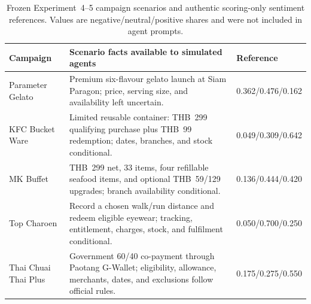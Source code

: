 \documentclass[conference]{IEEEtran}
\begin{document}
\begin{table}[t]
\caption{Frozen Experiment~4--5 campaign scenarios and authentic scoring-only
sentiment references. Values are negative/neutral/positive shares and were not
included in agent prompts.}
\label{tab:campaign-packets}
\centering
\scriptsize
\begin{tabular}{@{}p{}p{}p{}@{}}
\toprule
Campaign & Scenario facts available to simulated agents & Reference \\
\midrule
Parameter Gelato & Premium six-flavour gelato launch at Siam Paragon; price,
serving size, and availability left uncertain. & 0.362/0.476/0.162 \\
KFC Bucket Ware & Limited reusable container: THB~299 qualifying purchase plus
THB~99 redemption; dates, branches, and stock conditional. & 0.049/0.309/0.642 \\
MK Buffet & THB~299 net, 33 items, four refillable seafood items, and optional
THB~59/129 upgrades; branch availability conditional. & 0.136/0.444/0.420 \\
Top Charoen & Record a chosen walk/run distance and redeem eligible eyewear;
tracking, entitlement, charges, stock, and fulfilment conditional. & 0.050/0.700/0.250 \\
Thai Chuai Thai Plus & Government 60/40 co-payment through Paotang G-Wallet;
eligibility, allowance, merchants, dates, and exclusions follow official rules.
& 0.175/0.275/0.550 \\
\bottomrule
\end{tabular}
\end{table}
\end{document}
